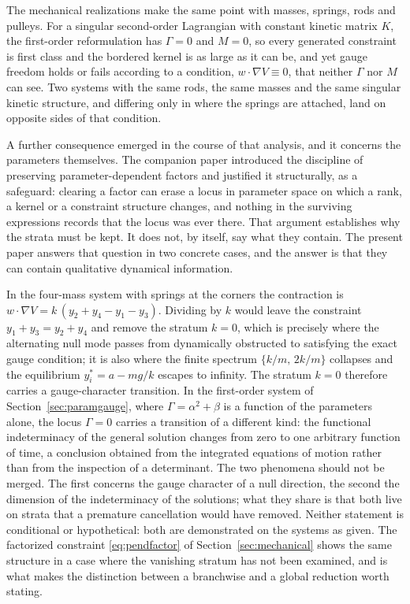 \documentclass[12pt]{article}
\theoremstyle{plain}
\theoremstyle{definition}
\theoremstyle{remark}
\begin{document}
	The mechanical realizations make the same point with masses, springs, rods and
	pulleys. For a singular second-order Lagrangian with constant kinetic matrix
	$K$, the first-order reformulation has $\Gamma=0$ and $M=0$, so every generated
	constraint is first class and the bordered kernel is as large as it can be, and
	yet gauge freedom holds or fails according to a condition,
	$w\!\cdot\!\nabla V\equiv0$, that neither $\Gamma$ nor $M$ can see. Two systems
	with the same rods, the same masses and the same singular kinetic structure, and
	differing only in where the springs are attached, land on opposite sides of that
	condition.
	
	A further consequence emerged in the course of that analysis, and it concerns
	the parameters themselves. The companion paper \cite{CLMCP2026} introduced the
	discipline of preserving parameter-dependent factors and justified it
	structurally, as a safeguard: clearing a factor can erase a locus in parameter
	space on which a rank, a kernel or a constraint structure changes, and nothing
	in the surviving expressions records that the locus was ever there. That
	argument establishes why the strata must be kept. It does not, by itself, say
	what they contain. The present paper answers that question in two concrete
	cases, and the answer is that they can contain qualitative dynamical
	information.
	
	In the four-mass system with springs at the corners the contraction is
	$w\!\cdot\!\nabla V=k\,(y_{2}+y_{4}-y_{1}-y_{3})$. Dividing by $k$ would leave
	the constraint $y_{1}+y_{3}=y_{2}+y_{4}$ and remove the stratum $k=0$, which is
	precisely where the alternating null mode passes from dynamically obstructed to
	satisfying the exact gauge condition; it is also where the finite spectrum
	$\{k/m,\,2k/m\}$ collapses and the equilibrium $y_{i}^{*}=a-mg/k$ escapes to
	infinity. The stratum $k=0$ therefore carries a gauge-character transition. In
	the first-order system of Section~\ref{sec:paramgauge}, where
	$\Gamma=\alpha^{2}+\beta$ is a function of the parameters alone, the locus
	$\Gamma=0$ carries a transition of a different kind: the functional
	indeterminacy of the general solution changes from zero to one arbitrary
	function of time, a conclusion obtained from the integrated equations of motion
	rather than from the inspection of a determinant. The two phenomena should not
	be merged. The first concerns the gauge character of a null direction, the
	second the dimension of the indeterminacy of the solutions; what they share is
	that both live on strata that a premature cancellation would have removed.
	Neither statement is conditional or hypothetical: both are demonstrated on the
	systems as given. The factorized constraint \eqref{eq:pendfactor} of
	Section~\ref{sec:mechanical} shows the same structure in a case where the
	vanishing stratum has not been examined, and is what makes the distinction
	between a branchwise and a global reduction worth stating.
	
\end{document}
